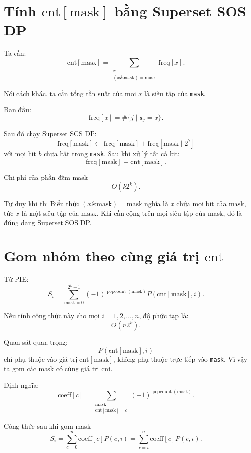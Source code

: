 \documentclass[12pt]{article}
\newcommand{\popc}{\operatorname{popcount}}
\newcommand{\cnt}{\mathrm{cnt}}
\newcommand{\coef}{\mathrm{coeff}}
\newcommand{\freq}{\mathrm{freq}}
\newcommand{\msk}{\mathrm{mask}}
\begin{document}
\section{\texorpdfstring{Tính \(\cnt[\msk]\) bằng Superset SOS DP}{Tính cnt[mask] bằng Superset SOS DP}}

Ta cần:
\[
\cnt[\msk]=
\sum_{\substack{x\\(x\mathbin{\&}\msk)=\msk}}
\freq[x].
\]

Nói cách khác, ta cần tổng tần suất của mọi \(x\) là siêu tập của \texttt{mask}.

Ban đầu:
\[
\freq[x]=\#\{j\mid a_j=x\}.
\]

Sau đó chạy Superset SOS DP:
\[
\freq[\msk]\leftarrow \freq[\msk]+\freq[\msk\mid 2^b]
\]
với mọi bit \(b\) chưa bật trong \texttt{mask}. Sau khi xử lý tất cả bit:
\[
\freq[\msk]=\cnt[\msk].
\]

\begin{resultbox}{Chi phí của phần đếm mask}
\[
O(k2^k).
\]
\end{resultbox}

\begin{thinkbox}{Tư duy khi thi}
Biểu thức \((x\mathbin{\&}\msk)=\msk\) nghĩa là \(x\) chứa mọi bit của \(\msk\), tức \(x\) là một siêu tập của \(\msk\). Khi cần cộng trên mọi siêu tập của mask, đó là đúng dạng Superset SOS DP.
\end{thinkbox}

\section{Gom nhóm theo cùng giá trị \texorpdfstring{\(\cnt\)}{cnt}}

Từ PIE:
\[
S_i=
\sum_{\msk=0}^{2^k-1}
(-1)^{\popc(\msk)}P(\cnt[\msk],i).
\]

Nếu tính công thức này cho mọi \(i=1,2,\ldots,n\), độ phức tạp là:
\[
O(n2^k).
\]

Quan sát quan trọng:
\[
P(\cnt[\msk],i)
\]
chỉ phụ thuộc vào giá trị \(\cnt[\msk]\), không phụ thuộc trực tiếp vào \texttt{mask}. Vì vậy ta gom các mask có cùng giá trị \(\cnt\).

Định nghĩa:
\[
\coef[c]=
\sum_{\substack{\msk\\\cnt[\msk]=c}}
(-1)^{\popc(\msk)}.
\]

\begin{resultbox}{Công thức sau khi gom mask}
\[
S_i=
\sum_{c=0}^{n}\coef[c]P(c,i)
=
\sum_{c=i}^{n}\coef[c]P(c,i).
\]
\end{resultbox}
\end{document}
